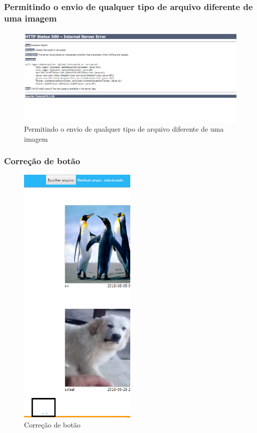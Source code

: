 \subsubsection{Permitindo o envio de qualquer tipo de arquivo diferente de uma imagem}
\begin{figure}[ht]
	\centering
	\includegraphics[width=\textwidth]{./imagens/erro_envio.png}
	\caption{Permitindo o envio de qualquer tipo de arquivo diferente de uma imagem}
	\label{fig:casoDeUso}
\end{figure}

\pagebreak

\subsubsection{Correção de botão}
\begin{figure}[ht]
	\centering
	\includegraphics[width=0.5\textwidth]{./imagens/paginas.png}
	\caption{Correção de botão}
	\label{fig:casoDeUso}
\end{figure}


